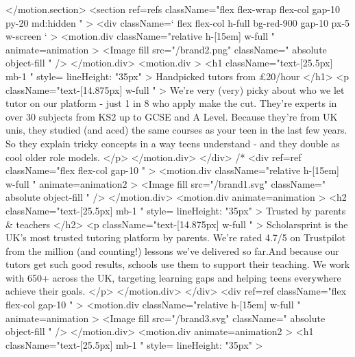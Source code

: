 {        </motion.section>
        <section ref={refs} className="flex flex-wrap flex-col gap-10  py-20 md:hidden  "  >
          <div  className={` flex flex-col h-full bg-red-900 gap-10 px-5 w-screen `}  >
            <motion.div className="relative h-[15em] w-full  " animate={animation} >
              <Image
                fill
                src={"/brand2.png"}
                className="  absolute  object-fill "
              />
            </motion.div>
            <motion.div  >
              <h1 className="text-[25.5px] mb-1 " style={{ lineHeight: "35px" }} >
                Handpicked tutors from £20/hour
              </h1>
              <p className="text-[14.875px] w-full  " >
                We're very (very) picky about who we let tutor on our platform - just 1 in 8 who apply make the cut. They're experts in over 30 subjects from KS2 up to GCSE and A Level. Because they're from UK unis, they studied (and aced) the same courses as your teen in the last few years. So they explain tricky concepts in a way teens understand - and they double as cool older role models.
              </p>
            </motion.div>
          </div>
          {/* <div ref={ref} className="flex flex-col gap-10 "  >
            <motion.div className="relative h-[15em] w-full  " animate={animation2} >
              <Image
                fill
                src={"/brand1.svg"}
                className="  absolute  object-fill "
              />
            </motion.div>
            <motion.div animate={animation} >
              <h2 className="text-[25.5px] mb-1 " style={{ lineHeight: "35px" }} >
                Trusted by parents & teachers
              </h2>
              <p className="text-[14.875px] w-full  " >
                Scholarsprint is the UK's most trusted tutoring platform by parents. We're rated 4.7/5 on Trustpilot from the million (and counting!) lessons we’ve delivered so far.And because our tutors get such good results, schools use them to support their teaching. We work with 650+ across the UK, targeting learning gaps and helping teens everywhere achieve their goals.
              </p>
            </motion.div>
          </div>
          <div ref={ref} className="flex flex-col gap-10 "  >
            <motion.div className="relative h-[15em] w-full  " animate={animation}    >
              <Image
                fill
                src={"/brand3.svg"}
                className="  absolute  object-fill "
              />
            </motion.div>
            <motion.div animate={animation2}  >
              <h1 className="text-[25.5px] mb-1 " style={{ lineHeight: "35px" }} >
}}
